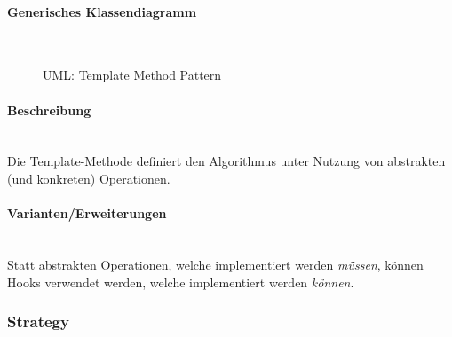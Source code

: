 \documentclass[ngerman]{tuda_summary}
\begin{document}
\paragraph{Generisches Klassendiagramm}\mbox{}\\
\begin{figure}[ht]
    \centering
    \caption{UML: Template Method Pattern}
\end{figure}

\paragraph{Beschreibung}\mbox{}\\
Die Template-Methode definiert den Algorithmus unter Nutzung von abstrakten (und konkreten) Operationen.

\paragraph{Varianten/Erweiterungen}\mbox{}\\
Statt abstrakten Operationen, welche implementiert werden \textit{müssen}, können Hooks verwendet werden, welche implementiert werden \textit{können}.

\subsubsection{Strategy}
\end{document}
